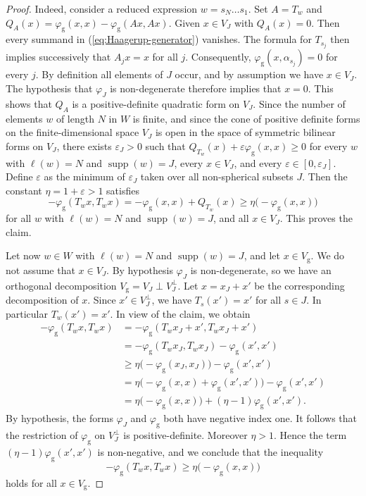 \documentclass[12pt,a4paper]{amsproc}
\theoremstyle{definition}
\DeclareMathOperator{\supp}{supp}
\newcommand{\rg}{\mathrm g}
\begin{document}
\begin{proof}
Indeed, consider a reduced expression  $w =s_N \dots s_1$. Set $A = T_w$ and $Q_A(x) = \varphi_\rg(x,x)-\varphi_\rg(Ax,Ax)$. Given $x \in V_J$ with $Q_A(x) = 0$. Then every summand  in (\ref{eq:Haagerup-generator}) vanishes. The formula for $T_{s_j}$ then implies successively that
$A_jx=x$ for all $j$. Consequently,
$\varphi_\rg(x,\alpha_{s_j})=0$ for every $j$.
By definition all elements of $J$ occur, and by assumption we have $x \in V_J$. The hypothesis that  $\varphi_J$ is non-degenerate
therefore implies that $x=0$. This shows that $Q_A$ is a positive-definite quadratic form on $V_J$. 
Since the number of elements $w$ of length $N$ in $W$ is finite, and since   the cone of positive definite forms on the finite-dimensional
space $V_J$ is open in the space of symmetric bilinear forms on $V_J$, there exists $\varepsilon_J>0$ such that
$
Q_{T_w}(x)+\varepsilon \varphi_\rg(x,x)\geq0
$
for every $w$ with $\ell(w)=N$ and $\supp(w) = J$,  every $x\in V_J$, and every $\varepsilon \in [0, \varepsilon_J]$.
Define $\varepsilon$ as the minimum of $ \varepsilon_J$ taken over all non-spherical subsets $J$. Then the constant  $\eta=1+\varepsilon>1$ satisfies
$$-\varphi_\rg(T_w x,T_w x)
=-\varphi_\rg(x,x)+Q_{T_w}(x)
\geq \eta\bigl(-\varphi_\rg(x,x)\bigr)
$$
for all $w$  with $\ell(w)=N$ and $\supp(w) = J$, and all $x\in V_J$.  This proves the claim. 

\medskip
Let now $w \in W$ with $\ell(w)=N$ and $\supp(w) = J$, and let $x \in V_\rg$. We do not assume that $x \in V_J$. By hypothesis $\varphi_J$ is non-degenerate, so we have an orthogonal decomposition $V_\rg = V_J \perp V_J^\perp$. Let $x = x_J + x'$ be the corresponding decomposition of $x$. Since $x' \in V_J^\perp$, we have $T_s(x') = x'$ for all $s \in J$. In particular $T_w(x') = x'$. In view of the claim, we obtain
\begin{align*}
-\varphi_\rg(T_w x,T_w x) 
&= -\varphi_\rg(T_w x_J + x',T_w x_J+x')\\
&= -\varphi_\rg(T_w x_J,T_w x_J) -\varphi_\rg( x',x') \\
&\geq \eta\bigl(-\varphi_\rg(x_J,x_J)\bigr)  -\varphi_\rg( x',x') \\
&=  \eta\bigl(-\varphi_\rg(x,x) + \varphi_\rg(x', x')\bigr)  -\varphi_\rg( x',x') \\
&=  \eta\bigl(-\varphi_\rg(x,x) \bigr) + (\eta-1) \varphi_\rg( x',x').
\end{align*}
By hypothesis, the forms $\varphi_J$ and $\varphi_\rg$ both have negative index one. It follows that the restriction of $\varphi_\rg$ on $V_J^\perp$ is positive-definite. Moreover $\eta>1$. Hence the term $ (\eta-1) \varphi_\rg( x',x')$ is non-negative, and we conclude that the inequality 
$$
-\varphi_\rg(T_w x,T_w x) \geq  \eta\bigl(-\varphi_\rg(x,x) \bigr) 
$$
holds for all $x \in V_\rg$. 



\end{proof}
\end{document}
